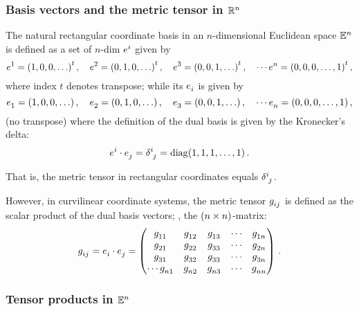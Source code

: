 \subsubsection{Basis vectors and the metric tensor in $\mathbb{R}^{n}$}

The natural rectangular coordinate basis in an $n$-dimensional Euclidean space $\mathbb{E}^{n}$ is defined as a set of $n$-dim  $\tsbvec i$ given by
%
\begin{equation*}
  \tsbvec 1 = \tuple{1,0,0,\dotsc}^t \,,\quad
  \tsbvec 2 = \tuple{0,1,0,\dotsc}^t \,,\quad
  \tsbvec 3 = \tuple{0,0,1,\dotsc}^t \,,\quad
  \dotsb
  \tsbvec n = \tuple{0,0,0,\dotsc,1}^t \,,
\end{equation*}
%
where index $t$ denotes transpose; while its  $\tsbcov i$ is given by
%
\begin{equation*}
  \tsbcov 1 = \tuple{1,0,0,\dotsc} \,,\quad
  \tsbcov 2 = \tuple{0,1,0,\dotsc} \,,\quad
  \tsbcov 3 = \tuple{0,0,1,\dotsc} \,,\quad
  \dotsb
  \tsbcov n = \tuple{0,0,0,\dotsc,1} \,,
\end{equation*}
%
(no transpose) where the definition of the dual basis is given by the Kronecker's delta:
%
\begin{equation*}
  \tsbvec i\iprod\tsbcov j  = \tkron{^i_j} 
                            = \diag\tuple{1,1,1,\dotsc,1}\,.
\end{equation*}

That is, the metric tensor in rectangular coordinates equals $\tkron{^i_j}$. 

However, in curvilinear coordinate systems, the metric tensor $\tcovmet ij$ is defined as the scalar product of the dual basis vectors; \ie, the $\parens{n\times n}$-matrix:
%
\begin{equation*}
  \tcovmet ij = \tsbcov i\iprod\tsbcov j 
              = \begin{pmatrix}
                  \tcovmet 11 & \tcovmet 12 & \tcovmet 13 & \dotsb & \tcovmet 1n \\
                  \tcovmet 21 & \tcovmet 22 & \tcovmet 33 & \dotsb & \tcovmet 2n \\
                  \tcovmet 31 & \tcovmet 32 & \tcovmet 33 & \dotsb & \tcovmet 3n \\
                  \dotsb
                  \tcovmet n1 & \tcovmet n2 & \tcovmet n3 & \dotsb & \tcovmet nn
                \end{pmatrix}\,.
\end{equation*}


\subsubsection{Tensor products in $\mathbb{E}^{n}$}

